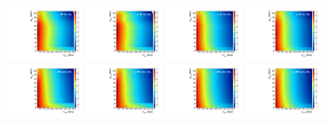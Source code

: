 \begin{figure}[htbp]
  \centering
  \includegraphics[width=0.2\textwidth]{fig/analysis/template_nonRes_mu_HP_bb_LDy.pdf}
  \includegraphics[width=0.2\textwidth]{fig/analysis/template_nonRes_e_HP_bb_LDy.pdf}
  \includegraphics[width=0.2\textwidth]{fig/analysis/template_nonRes_mu_LP_bb_LDy.pdf}
  \includegraphics[width=0.2\textwidth]{fig/analysis/template_nonRes_e_LP_bb_LDy.pdf}\\
  \includegraphics[width=0.2\textwidth]{fig/analysis/template_nonRes_mu_HP_nobb_LDy.pdf}
  \includegraphics[width=0.2\textwidth]{fig/analysis/template_nonRes_e_HP_nobb_LDy.pdf}
  \includegraphics[width=0.2\textwidth]{fig/analysis/template_nonRes_mu_LP_nobb_LDy.pdf}
  \includegraphics[width=0.2\textwidth]{fig/analysis/template_nonRes_e_LP_nobb_LDy.pdf}\\

\end{figure}
